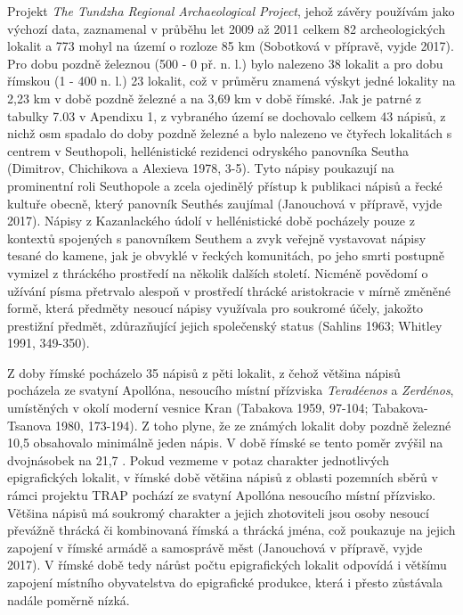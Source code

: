 Projekt {\em The Tundzha Regional Archaeological Project}, jehož závěry používám jako výchozí data, zaznamenal v průběhu let 2009 až 2011 celkem 82 archeologických lokalit a 773 mohyl na území o rozloze 85 km (Sobotková v přípravě, vyjde 2017). Pro dobu pozdně železnou (500 - 0 př. n. l.) bylo nalezeno 38 lokalit a pro dobu římskou (1 - 400 n. l.) 23 lokalit, což v průměru znamená výskyt jedné lokality na 2,23 km v době pozdně železné a na 3,69 km v době římské. Jak je patrné z tabulky 7.03 v Apendixu 1, z vybraného území se dochovalo celkem 43 nápisů, z nichž osm spadalo do doby pozdně železné a bylo nalezeno ve čtyřech lokalitách s centrem v Seuthopoli, hellénistické rezidenci odryského panovníka Seutha (Dimitrov, Chichikova a Alexieva 1978, 3-5). Tyto nápisy poukazují na prominentní roli Seuthopole a zcela ojedinělý přístup k publikaci nápisů a řecké kultuře obecně, který panovník Seuthés zaujímal (Janouchová v přípravě, vyjde 2017). Nápisy z Kazanlackého údolí v hellénistické době pocházely pouze z kontextů spojených s panovníkem Seuthem a zvyk veřejně vystavovat nápisy tesané do kamene, jak je obvyklé v řeckých komunitách, po jeho smrti postupně vymizel z thráckého prostředí na několik dalších století. Nicméně povědomí o užívání písma přetrvalo alespoň v prostředí thrácké aristokracie v mírně změněné formě, která předměty nesoucí nápisy využívala pro soukromé účely, jakožto prestižní předmět, zdůrazňující jejich společenský status (Sahlins 1963; Whitley 1991, 349-350).

Z doby římské pocházelo 35 nápisů z pěti lokalit, z čehož většina nápisů pocházela ze svatyní Apollóna, nesoucího místní přízviska {\em Teradéenos} a {\em Zerdénos}, umístěných v okolí moderní vesnice Kran (Tabakova 1959, 97-104; Tabakova-Tsanova 1980, 173-194). Z toho plyne, že ze známých lokalit doby pozdně železné 10,5  obsahovalo minimálně jeden nápis. V době římské se tento poměr zvýšil na dvojnásobek na 21,7 . Pokud vezmeme v potaz charakter jednotlivých epigrafických lokalit, v římské době většina nápisů z oblasti pozemních sběrů v rámci projektu TRAP pochází ze svatyní Apollóna nesoucího místní přízvisko. Většina nápisů má soukromý charakter a jejich zhotoviteli jsou osoby nesoucí převážně thrácká či kombinovaná římská a thrácká jména, což poukazuje na jejich zapojení v římské armádě a samosprávě měst (Janouchová v přípravě, vyjde 2017). V římské době tedy nárůst počtu epigrafických lokalit odpovídá i většímu zapojení místního obyvatelstva do epigrafické produkce, která i přesto zůstávala nadále poměrně nízká.

